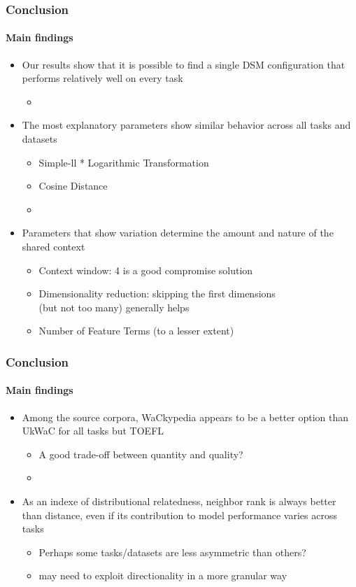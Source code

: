 \documentclass[t]{beamer} %
\begin{document}
\begin{frame}
  \frametitle{Conclusion}
  \framesubtitle{Main findings}

  \begin{itemize}
  \item Our results show that it is possible to find a single DSM configuration that performs relatively well on every task
    \begin{itemize}
    \item[]
    \end{itemize}
  \item The most explanatory parameters show similar behavior across all tasks and datasets
    \begin{itemize}
    \item Simple-ll * Logarithmic Transformation 
    \item Cosine Distance
    \item[]
    \end{itemize}
  \item Parameters that show variation determine the amount and nature of the shared context
    \begin{itemize}
    \item Context window: 4 is a good compromise solution
    \item Dimensionality reduction: skipping the first dimensions\\ (but not too many) generally helps 
    \item Number of Feature Terms (to a lesser extent)
    \end{itemize}
  \end{itemize}
\end{frame}


\begin{frame}
  \frametitle{Conclusion}
  \framesubtitle{Main findings}
  
  \begin{itemize}
  \item Among the source corpora, WaCkypedia appears to be a better option than UkWaC for all tasks but TOEFL
    \begin{itemize}
    \item A good trade-off between quantity and quality?
    \item[]
    \end{itemize}
  \item As an indexe of distributional relatedness, neighbor rank is always better than distance, even if its contribution to model performance varies across tasks
    \begin{itemize}
    \item Perhaps some tasks/datasets are less asymmetric than others? 
    \item may need to exploit directionality in a more granular way
    \end{itemize}
  \end{itemize}
\end{frame}



\end{document}
